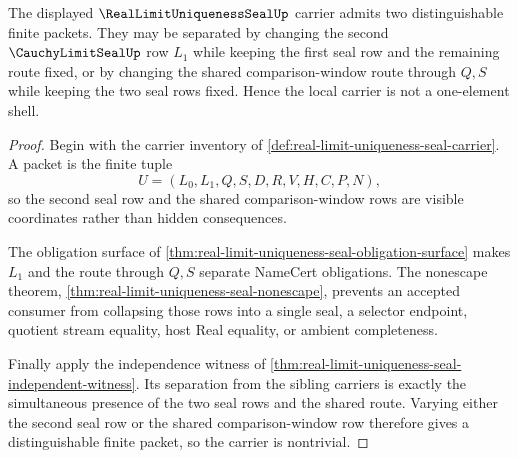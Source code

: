 \begin{theorem}
\label{thm:real-limit-uniqueness-seal-nontrivial-witness}
The displayed $\RealLimitUniquenessSealUp$ carrier admits two distinguishable finite packets. They may be separated by changing the second $\CauchyLimitSealUp$ row $L_1$ while keeping the first seal row and the remaining route fixed, or by changing the shared comparison-window route through $Q,S$ while keeping the two seal rows fixed. Hence the local carrier is not a one-element shell.
\end{theorem}
\begin{proof}
Begin with the carrier inventory of \autoref{def:real-limit-uniqueness-seal-carrier}. A packet is the finite tuple
$$
U=(L_0,L_1,Q,S,D,R,V,H,C,P,N),
$$
so the second seal row and the shared comparison-window rows are visible coordinates rather than hidden consequences.

The obligation surface of \autoref{thm:real-limit-uniqueness-seal-obligation-surface} makes $L_1$ and the route through $Q,S$ separate NameCert obligations. The nonescape theorem, \autoref{thm:real-limit-uniqueness-seal-nonescape}, prevents an accepted consumer from collapsing those rows into a single seal, a selector endpoint, quotient stream equality, host Real equality, or ambient completeness.

Finally apply the independence witness of \autoref{thm:real-limit-uniqueness-seal-independent-witness}. Its separation from the sibling carriers is exactly the simultaneous presence of the two seal rows and the shared route. Varying either the second seal row or the shared comparison-window row therefore gives a distinguishable finite packet, so the carrier is nontrivial.
\end{proof}

